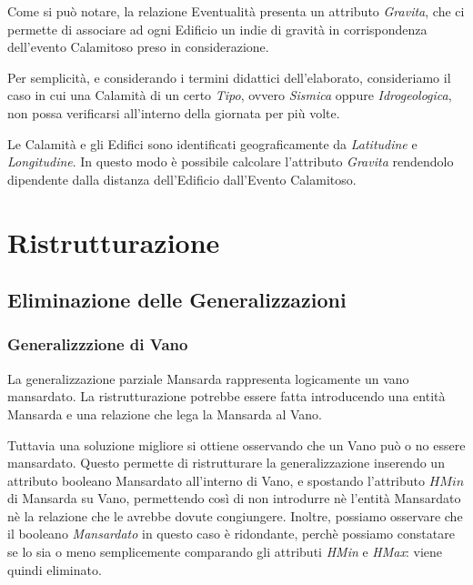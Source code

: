 \documentclass[12pt,a4paper]{report}
\begin{document}
        Come si può notare, la relazione Eventualità presenta un attributo \emph{Gravita}, che ci permette di associare ad ogni Edificio un indie di gravità in corrispondenza dell'evento Calamitoso preso in considerazione.

        Per semplicità, e considerando i termini didattici dell'elaborato, consideriamo il caso in cui una Calamità di un certo \emph{Tipo}, ovvero \emph{Sismica} oppure \emph{Idrogeologica}, non possa verificarsi all'interno della giornata per più volte.

        Le Calamità e gli Edifici sono identificati geograficamente da \emph{Latitudine} e \emph{Longitudine}. In questo modo è possibile calcolare l'attributo \emph{Gravita} rendendolo dipendente dalla distanza dell'Edificio dall'Evento Calamitoso.
\part{Ristrutturazione}

    \chapter{Eliminazione delle Generalizzazioni}
        \section{Generalizzzione di Vano}
            \label{ref1}
            La generalizzazione parziale Mansarda rappresenta logicamente un vano mansardato. La ristrutturazione potrebbe essere fatta introducendo una entità Mansarda e una relazione che lega la Mansarda al Vano.

            Tuttavia una soluzione migliore si ottiene osservando che un Vano può o no essere mansardato. Questo permette di ristrutturare la generalizzazione inserendo un attributo booleano Mansardato all'interno di Vano, e spostando l'attributo $HMin$ di Mansarda su Vano, permettendo così di non introdurre nè l'entità Mansardato nè la relazione che le avrebbe dovute congiungere. Inoltre, possiamo osservare che il booleano \emph{Mansardato} in questo caso è ridondante, perchè possiamo constatare se lo sia o meno semplicemente comparando gli attributi \emph{HMin} e \emph{HMax}: viene quindi eliminato.
\end{document}
